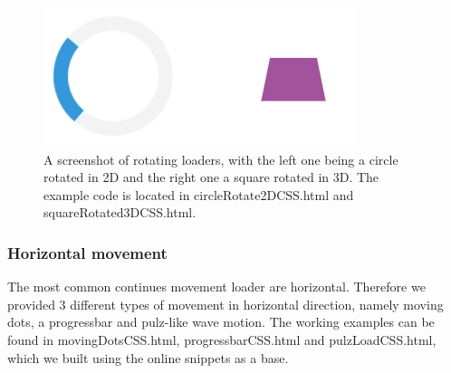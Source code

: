 \begin{figure}[h]
\centering
\includegraphics[keepaspectratio,width=\hsize,height=\halfh]
{images/rotatingLoad.png}

\caption[Rotational Loading Animation Examples]{
A screenshot of rotating loaders, with the left one being a circle rotated in 2D and the right one a square rotated in 3D. The example code is located in circleRotate2DCSS.html and squareRotated3DCSS.html.
}
\label{fig:rotationLoad}
\end{figure}

\subsubsection{Horizontal movement} %
\label{subsub:menu}
The most common continues movement loader are horizontal. Therefore we provided 3 different types of movement in horizontal direction, namely moving dots, a progressbar and pulz-like wave motion. The working examples can be found in  
movingDotsCSS.html, progressbarCSS.html and pulzLoadCSS.html, which we built using the \citet{otherLoaders} online snippets as a base.

